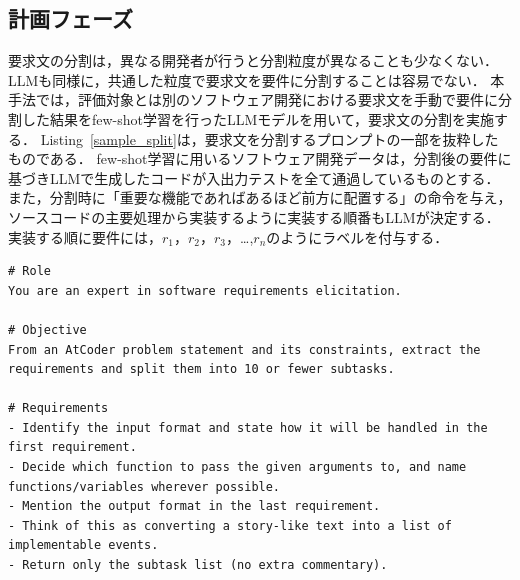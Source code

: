 \documentclass[submit,techrep,noauthor]{ipsj}
\newcommand{\todo}[1]{\colorbox{yellow}{{\bf TODO}:}{\color{red} {\textbf{[#1]}}}}
\begin{document}



\subsection{計画フェーズ}
要求文の分割は，異なる開発者が行うと分割粒度が異なることも少なくない\cite{split_size}．LLMも同様に，共通した粒度で要求文を要件に分割することは容易でない．
本手法では，評価対象とは別のソフトウェア開発における要求文を手動で要件に分割した結果をfew-shot学習を行ったLLMモデルを用いて，要求文の分割を実施する．
Listing~\ref{sample_split}は，要求文を分割するプロンプトの一部を抜粋したものである．
few-shot学習に用いるソフトウェア開発データは，分割後の要件に基づきLLMで生成したコードが入出力テストを全て通過しているものとする．
また，分割時に「重要な機能であればあるほど前方に配置する」の命令を与え，ソースコードの主要処理から実装するように実装する順番もLLMが決定する．
実装する順に要件には，$r_1$，$r_2$，$r_3$，\dots,$r_n$のようにラベルを付与する．

\begin{lstlisting}[caption=要求分割のためのプロンプト（一部抜粋）, label=sample_split, captionpos=t, columns=fullflexible, breaklines=true]
# Role
You are an expert in software requirements elicitation.

# Objective
From an AtCoder problem statement and its constraints, extract the requirements and split them into 10 or fewer subtasks.

# Requirements
- Identify the input format and state how it will be handled in the first requirement.
- Decide which function to pass the given arguments to, and name functions/variables wherever possible.
- Mention the output format in the last requirement.
- Think of this as converting a story-like text into a list of implementable events.
- Return only the subtask list (no extra commentary).
\end{lstlisting}
\end{document}
